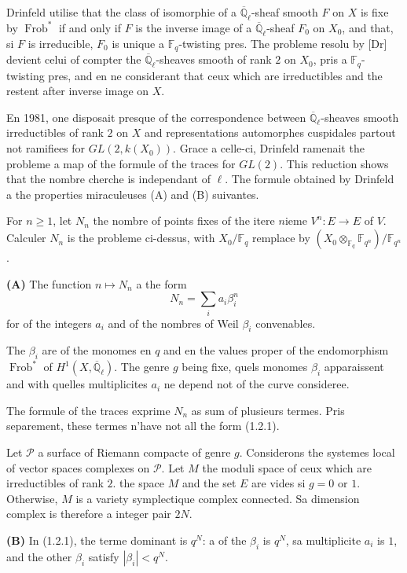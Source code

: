 \documentclass[11pt,a4paper]{article}
\theoremstyle{plain}
\theoremstyle{definition}
\DeclareMathOperator{\Frob}{Frob}
\newcommand{\F}{\mathbb{F}}
\newcommand{\Ql}{\overline{\mathbb{Q}}_\ell}
\begin{document}
Drinfeld utilise that the class of isomorphie of a $\Ql$-sheaf smooth $F$ on $X$ is fixe by $\Frob^*$ if and only if $F$ is the inverse image of a $\Ql$-sheaf $F_0$ on $X_0$, and that, si $F$ is irreducible, $F_0$ is unique a $\F_q$-twisting pres. The probleme resolu by [Dr] devient celui of compter the $\Ql$-sheaves smooth of rank $2$ on $X_0$, pris a $\F_q$-twisting pres, and en ne considerant that ceux which are irreductibles and the restent after inverse image on $X$.

En 1981, one disposait presque of the correspondence between $\Ql$-sheaves smooth irreductibles of rank $2$ on $X$ and representations automorphes cuspidales partout not ramifiees for $GL(2,k(X_0))$. Grace a celle-ci, Drinfeld ramenait the probleme a map of the formule of the traces for $GL(2)$. This reduction shows that the nombre cherche is independant of $\ell$. The formule obtained by Drinfeld a the properties miraculeuses (A) and (B) suivantes.

For $n \geq 1$, let $N_n$ the nombre of points fixes of the itere $n$ieme $V^n: E \to E$ of $V$. Calculer $N_n$ is the probleme ci-dessus, with $X_0/\F_q$ remplace by $(X_0 \otimes_{\F_q} \F_{q^n})/\F_{q^n}$.

\medskip
\noindent\textbf{(A)} The function $n \mapsto N_n$ a the form
\begin{equation}
N_n = \sum_i a_i \beta_i^n
\tag{1.2.1}
\end{equation}
for of the integers $a_i$ and of the nombres of Weil $\beta_i$ convenables.

The $\beta_i$ are of the monomes en $q$ and en the values proper of the endomorphism $\Frob^*$ of $H^1(X, \Ql)$. The genre $g$ being fixe, quels monomes $\beta_i$ apparaissent and with quelles multiplicites $a_i$ ne depend not of the curve consideree.

The formule of the traces exprime $N_n$ as sum of plusieurs termes. Pris separement, these termes n'have not all the form (1.2.1).

Let $\mathcal{P}$ a surface of Riemann compacte of genre $g$. Considerons the systemes local of vector spaces complexes on $\mathcal{P}$. Let $M$ the moduli space of ceux which are irreductibles of rank $2$. the space $M$ and the set $E$ are vides si $g = 0$ or $1$. Otherwise, $M$ is a variety symplectique complex connected. Sa dimension complex is therefore a integer pair $2N$.

\medskip
\noindent\textbf{(B)} In (1.2.1), the terme dominant is $q^N$: a of the $\beta_i$ is $q^N$, sa multiplicite $a_i$ is $1$, and the other $\beta_i$ satisfy $|\beta_i| < q^N$.
\end{document}
